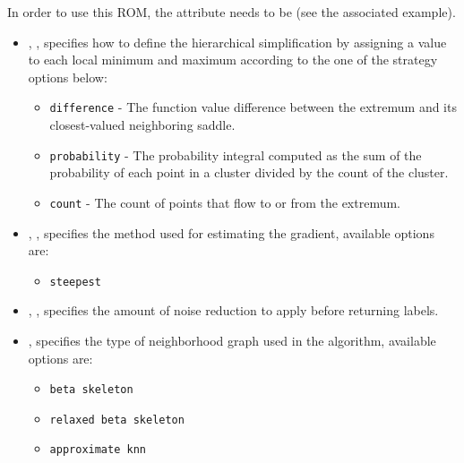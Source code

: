 In order to use this ROM, the  attribute  needs to
be  (see the associated example).
%
\subnodesIntro
%
\begin{itemize}
  \item {}, , specifies how
  to define the hierarchical simplification by assigning a value to each local
  minimum and maximum according to the one of the strategy options below:
  \begin{itemize}
    \item \texttt{difference} - The function value difference between the
    extremum and its closest-valued neighboring saddle.
    \item \texttt{probability} - The probability integral computed as the
    sum of the probability of each point in a cluster divided by the count of
    the cluster.
    \item \texttt{count} - The count of points that flow to or from the
    extremum.
  \end{itemize}
  \item {}, , specifies the
  method used for estimating the gradient, available options are:
  \begin{itemize}
    \item \texttt{steepest}
  \end{itemize}
  \item {}, , specifies the
  amount of noise reduction to apply before returning labels.
  \item {} , specifies the type
  of neighborhood graph used in the algorithm, available options are:
  \begin{itemize}
    \item \texttt{beta skeleton}
    \item \texttt{relaxed beta skeleton}
    \item \texttt{approximate knn}
  \end{itemize}

\end{itemize}
